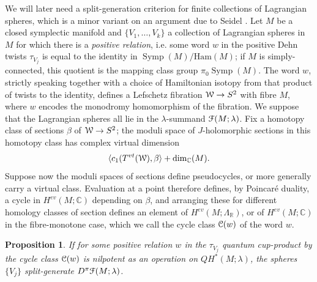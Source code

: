 \documentclass[reqno,10pt]{amsart}
\numberwithin{equation}{section}
\newcommand{\bC}{{\mathbb C}}
\newcommand{\bR}{{\mathbb R}}
\newcommand{\scrC}{\EuScript{C}}
\newcommand{\scrF}{\EuScript{F}}
\newcommand{\scrW}{\EuScript{W}}
\newcommand{\Symp}{\operatorname{Symp}}
\newtheorem{Proposition}[thm]{Proposition}
\theoremstyle{remark}
\begin{document}
We will later need a split-generation criterion for finite collections of Lagrangian spheres, which is a minor variant on an argument due to Seidel \cite{Seidel:HMSgenus2}.  Let $M$ be a closed symplectic manifold and $\{V_1,\ldots, V_k\}$ a collection of Lagrangian spheres in $M$ for which there is a \emph{positive relation}, i.e. some word $w$ in the positive Dehn twists $\tau_{V_j}$ is equal to the identity in $\Symp(M)/\textrm{Ham}(M)$; if $M$ is simply-connected, this quotient is the mapping class group $\pi_0\Symp(M)$.  The word $w$, strictly speaking together with a choice of Hamiltonian isotopy from that product of twists to the identity,  defines a Lefschetz fibration $\scrW \rightarrow S^2$ with fibre $M$, where $w$ encodes the monodromy homomorphism of the fibration.  We suppose that the Lagrangian spheres all lie in the $\lambda$-summand $\scrF(M;\lambda)$.  Fix a homotopy class of sections $\beta$ of $\scrW \rightarrow S^2$; the moduli space of $J$-holomorphic sections in this homotopy class has complex virtual dimension
\[
\langle c_1(T^{vt}(\scrW), \beta \rangle + \dim_{\bC}(M).
\]
Suppose now the moduli spaces of sections define  pseudocycles, or more generally carry a virtual class.  Evaluation at a point therefore defines, by Poincar\'e duality, a cycle in $H^{ev}(M;\bC)$ depending on $\beta$, and arranging these for different homology classes of section defines an element of $H^{ev}(M;\Lambda_{\bR})$, or of $H^{ev}(M;\bC)$ in the fibre-monotone case, which we call the cycle class $\scrC(w)$ of the word $w$.


\begin{Proposition} \label{Prop:Split-Generate-basic}
If for some positive relation $w$ in the $\tau_{V_j}$ quantum cup-product by the cycle class $\scrC(w)$ is nilpotent as an operation on $QH^*(M;\lambda)$,  the spheres $\{V_j\}$ split-generate  $D^{\pi}\scrF(M;\lambda)$. 
\end{Proposition}
\end{document}
